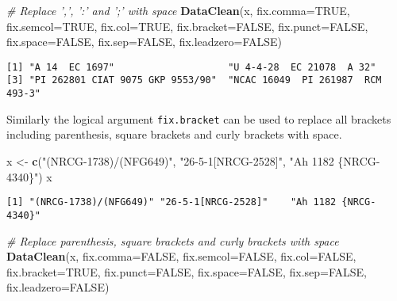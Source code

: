 \documentclass[]{article}
\newenvironment{Shaded}{\begin{snugshade}}{\end{snugshade}}
\newcommand{\CommentTok}[1]{\textcolor[rgb]{0.56,0.35,0.01}{\textit{#1}}}
\newcommand{\DataTypeTok}[1]{\textcolor[rgb]{0.13,0.29,0.53}{#1}}
\newcommand{\KeywordTok}[1]{\textcolor[rgb]{0.13,0.29,0.53}{\textbf{#1}}}
\newcommand{\NormalTok}[1]{#1}
\newcommand{\OtherTok}[1]{\textcolor[rgb]{0.56,0.35,0.01}{#1}}
\newcommand{\StringTok}[1]{\textcolor[rgb]{0.31,0.60,0.02}{#1}}
\begin{document}
\begin{Shaded}
\begin{Highlighting}[]
\CommentTok{# Replace ',', ':' and ';' with space}
\KeywordTok{DataClean}\NormalTok{(x, }\DataTypeTok{fix.comma=}\OtherTok{TRUE}\NormalTok{, }\DataTypeTok{fix.semcol=}\OtherTok{TRUE}\NormalTok{, }\DataTypeTok{fix.col=}\OtherTok{TRUE}\NormalTok{,}
          \DataTypeTok{fix.bracket=}\OtherTok{FALSE}\NormalTok{, }\DataTypeTok{fix.punct=}\OtherTok{FALSE}\NormalTok{, }\DataTypeTok{fix.space=}\OtherTok{FALSE}\NormalTok{, }\DataTypeTok{fix.sep=}\OtherTok{FALSE}\NormalTok{,}
          \DataTypeTok{fix.leadzero=}\OtherTok{FALSE}\NormalTok{)}
\end{Highlighting}
\end{Shaded}

\begin{verbatim}
[1] "A 14  EC 1697"                    "U 4-4-28  EC 21078  A 32"        
[3] "PI 262801 CIAT 9075 GKP 9553/90"  "NCAC 16049  PI 261987  RCM 493-3"
\end{verbatim}

Similarly the logical argument \texttt{fix.bracket} can be used to
replace all brackets including parenthesis, square brackets and curly
brackets with space.

\begin{Shaded}
\begin{Highlighting}[]
\NormalTok{x <-}\StringTok{ }\KeywordTok{c}\NormalTok{(}\StringTok{"(NRCG-1738)/(NFG649)"}\NormalTok{, }\StringTok{"26-5-1[NRCG-2528]"}\NormalTok{, }\StringTok{"Ah 1182 \{NRCG-4340\}"}\NormalTok{)}
\NormalTok{x}
\end{Highlighting}
\end{Shaded}

\begin{verbatim}
[1] "(NRCG-1738)/(NFG649)" "26-5-1[NRCG-2528]"    "Ah 1182 {NRCG-4340}" 
\end{verbatim}

\begin{Shaded}
\begin{Highlighting}[]
\CommentTok{# Replace parenthesis, square brackets and curly brackets with space}
\KeywordTok{DataClean}\NormalTok{(x, }\DataTypeTok{fix.comma=}\OtherTok{FALSE}\NormalTok{, }\DataTypeTok{fix.semcol=}\OtherTok{FALSE}\NormalTok{, }\DataTypeTok{fix.col=}\OtherTok{FALSE}\NormalTok{,}
          \DataTypeTok{fix.bracket=}\OtherTok{TRUE}\NormalTok{,}
          \DataTypeTok{fix.punct=}\OtherTok{FALSE}\NormalTok{, }\DataTypeTok{fix.space=}\OtherTok{FALSE}\NormalTok{, }\DataTypeTok{fix.sep=}\OtherTok{FALSE}\NormalTok{, }\DataTypeTok{fix.leadzero=}\OtherTok{FALSE}\NormalTok{)}
\end{Highlighting}
\end{Shaded}
\end{document}
